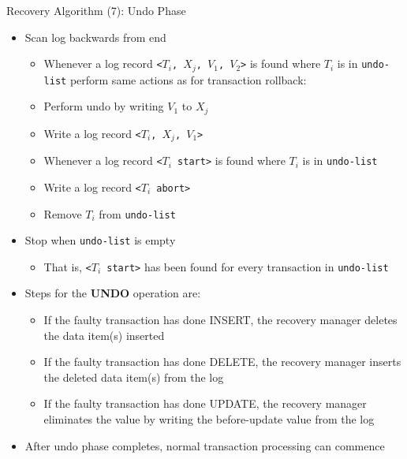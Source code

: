 \documentclass[aspectratio=169, xcolor=dvipsnames]{beamer}
\begin{document}
\begin{frame}{Recovery Algorithm (7): Undo Phase}
    \begin{itemize}[<+->]
        \item Scan log backwards from end
        \begin{itemize}
            \item[$\triangleright$] Whenever a log record \texttt{<$T_i$, $X_j$, $V_1$, $V_2$>} is found where $T_i$ is in \texttt{undo-list} perform same actions as for transaction rollback:
            \item[$\bullet$] Perform undo by writing $V_1$ to $X_j$
            \item[$\bullet$] Write a log record \texttt{<$T_i$, $X_j$, $V_1$>}
            \item[$\triangleright$] Whenever a log record \texttt{<$T_i$ start>} is found where $T_i$ is in \texttt{undo-list}
            \item[$\bullet$] Write a log record \texttt{<$T_i$ abort>}
            \item[$\bullet$] Remove $T_i$ from \texttt{undo-list}
        \end{itemize}
        \item Stop when \texttt{undo-list} is empty
        \begin{itemize}
            \item[$\triangleright$] That is, \texttt{<$T_i$ start>} has been found for every transaction in \texttt{undo-list}
        \end{itemize}
        \item Steps for the \textbf{UNDO} operation are:
        \begin{itemize}
            \item[$\triangleright$] If the faulty transaction has done INSERT, the recovery manager deletes the data item(s) inserted
            \item[$\triangleright$] If the faulty transaction has done DELETE, the recovery manager inserts the deleted data item(s) from the log
            \item[$\triangleright$] If the faulty transaction has done UPDATE, the recovery manager eliminates the value by writing the before-update value from the log
        \end{itemize}
        \item After undo phase completes, normal transaction processing can commence
    \end{itemize}
\end{frame}
\end{document}
